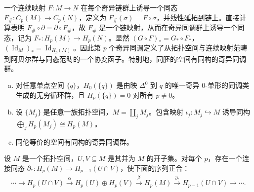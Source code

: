 \documentclass[../../main.tex]{subfiles}
\begin{document}
一个连续映射 $F:M\to N$ 在每个奇异链群上诱导一个同态 $F_\#:C_p(M)\to C_p(N)$，定义为 $F_\#(\sigma)=F\circ\sigma$，并线性延拓到链上。直接计算表明 $F_\#\circ\partial=\partial\circ F_\#$，故 $F_\#$ 是一个链映射，从而在奇异同调群上诱导一个同态，记为 $F_*:H_p(M)\to H_p(N)$。显然 $(G\circ F)_*=G_*\circ F_*$，$(\operatorname{Id}_M)_*=\operatorname{Id}_{H_p(M)}$。因此第 $p$ 个奇异同调定义了从拓扑空间与连续映射范畴到阿贝尔群与同态范畴的一个协变函子。特别地，同胚的空间有同构的奇异同调群。

\begin{proposition}[奇异同调群的性质]\label{proposition:ch18-singular-homology-properties}
\begin{enumerate}[(a)]
\item 对任意单点空间 $\{q\}$，$H_0(\{q\})$ 是由映 $\Delta^0$ 到 $q$ 的唯一奇异 $0$-单形的同调类生成的无穷循环群，且 $H_p(\{q\})=0$ 对所有 $p\neq0$。
\item 设 $\{M_j\}$ 是任意一族拓扑空间，$M=\coprod_j M_j$。包含映射 $\iota_j:M_j\hookrightarrow M$ 诱导同构 $\bigoplus_j H_p(M_j)\cong H_p(M)$。
\item 同伦等价的空间有同构的奇异同调群。
\end{enumerate}
\end{proposition}

\begin{theorem}\label{theorem:ch18-mayer-vietoris-singular}
设 $M$ 是一个拓扑空间，$U,V\subseteq M$ 是其并为 $M$ 的开子集。对每个 $p$，存在一个连接同态 $\partial_*:H_p(M)\to H_{p-1}(U\cap V)$，使下面的序列正合：
\begin{align*}
\cdots\to H_p(U\cap V)\xrightarrow{\alpha}H_p(U)\oplus H_p(V)\xrightarrow{\beta}H_p(M)\xrightarrow{\partial_*}H_{p-1}(U\cap V)\to\cdots.
\end{align*}
\end{theorem}
\end{document}
